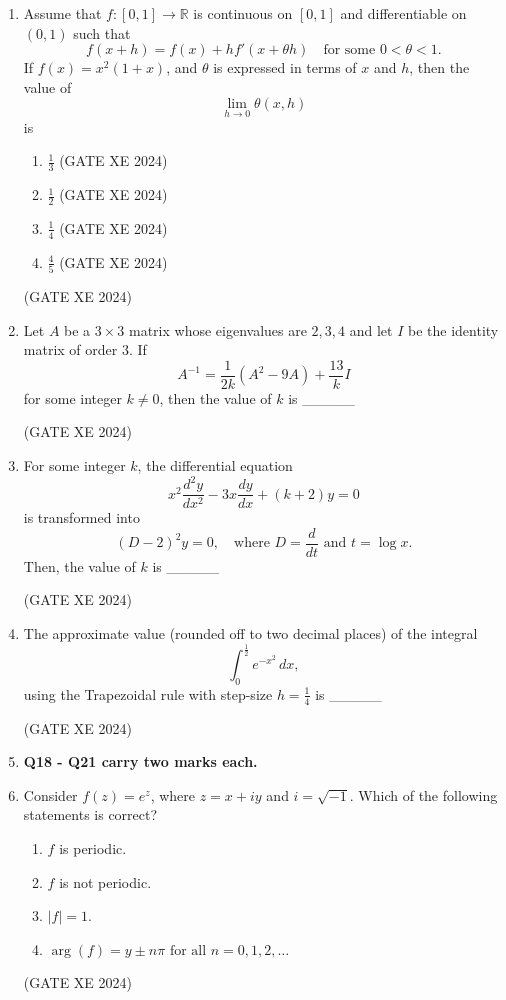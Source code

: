 \documentclass[12pt]{article}
\begin{document}
\begin{enumerate}
\item Assume that $f:[0,1] \to \mathbb{R}$ is continuous on $[0,1]$ and differentiable on $(0,1)$ such that  
\[
f(x+h) = f(x) + h f'(x+\theta h) \quad \text{for some } 0 < \theta < 1.
\]  
If $f(x) = x^2(1+x)$, and $\theta$ is expressed in terms of $x$ and $h$, then the value of  
$$
\lim_{h \to 0} \theta(x,h)
$$
is  

\begin{enumerate}
\item $\tfrac{1}{3}$ \hfill (GATE XE 2024)  
\item $\tfrac{1}{2}$ \hfill (GATE XE 2024)  
\item $\tfrac{1}{4}$ \hfill (GATE XE 2024)  
\item $\tfrac{4}{5}$ \hfill (GATE XE 2024)  
\end{enumerate}
(GATE XE 2024)

\item Let $A$ be a $3 \times 3$ matrix whose eigenvalues are $2, 3, 4$ and let $I$ be the identity matrix of order $3$. If  
$$
A^{-1} = \frac{1}{2k} (A^2 - 9A) + \frac{13}{k} I
$$
for some integer $k \neq 0$, then the value of $k$ is \_\_\_\_\_  

(GATE XE 2024)

\item For some integer $k$, the differential equation  
$$
x^2 \frac{d^2y}{dx^2} - 3x \frac{dy}{dx} + (k+2)y = 0
$$  
is transformed into  
$$
(D-2)^2 y = 0, \quad \text{where } D = \frac{d}{dt} \text{ and } t = \log x.
$$ 
Then, the value of $k$ is \_\_\_\_\_  

(GATE XE 2024)

\item The approximate value (rounded off to two decimal places) of the integral  
$$
\int_{0}^{\tfrac{1}{2}} e^{-x^2} \, dx,
$$ 
using the Trapezoidal rule with step-size $h = \tfrac{1}{4}$ is \_\_\_\_\_  

(GATE XE 2024)

\item[] \textbf{Q18 - Q21 carry two marks each.} 
\item Consider $f(z)=e^{z}$, where $z=x+iy$ and $i=\sqrt{-1}$. Which of the following
statements is correct?

\begin{enumerate}[label=(\Alph*)]
\item $f$ is periodic.
\item $f$ is not periodic.
\item $\lvert f\rvert=1$.
\item $\arg(f)=y\pm n\pi \text{ for all } n=0,1,2,\ldots$
\end{enumerate}
(GATE XE 2024)


\end{enumerate}
\end{document}
